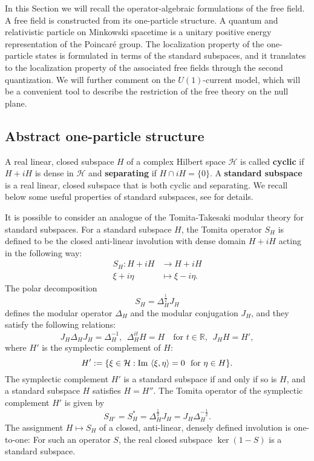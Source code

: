 \documentclass[12pt]{article}
\def\RR{{\mathbb R}}
\def\H{{\mathcal H}}
\def\im{\mathrm{Im}\,}
\theoremstyle{remark}
\begin{document}
 In this Section we will recall the operator-algebraic formulations of the free field.
 A free field is constructed from its one-particle structure. A quantum and relativistic particle on Minkowski spacetime is a unitary positive energy representation of the Poincar\'e group. The localization property of the one-particle states is formulated in terms of the standard subspaces,
 and it translates to the localization property of the associated free fields through the second quantization.
 We will further comment on the $U(1)$-current model, which will be a convenient tool to describe the restriction of the free theory  on the null plane.

\subsection{Abstract one-particle structure}\label{sec:ss}
A real linear, closed subspace $H$ of a complex Hilbert space $\H$ is called \textbf{cyclic} if $H+iH$ is dense in $\H$
and \textbf{separating} if $H\cap i H=\{0\}$. A \textbf{standard subspace} is a real linear, closed subspace that is both cyclic and separating.
We recall below some useful properties of standard subspaces, see \cite{Longo08} for details.


It is possible to consider an analogue of the Tomita-Takesaki modular theory for standard subspaces.
For a standard subspace $H$, the Tomita operator $S_H$ is defined to be the closed anti-linear involution with dense domain $H+iH$
acting in the following way:
\begin{align*}
S_H: H+iH &\rightarrow H+iH \\
\xi+i\eta &\mapsto \xi -i \eta.
\end{align*}
The polar decomposition
\[
S_H= \Delta_H^\frac{1}{2}J_H
\]
defines the modular operator $\Delta_H$ and the modular conjugation $J_H$, and they satisfy the following relations:
\[
J_H\Delta_H J_H= \Delta_H^{-1},\ \ \Delta_H^{it}H=H \quad\text{for } t\in\RR, \ \ J_H H=H',
\]
where $H'$ is the symplectic complement of $H$:
\[
H':=\{\xi \in \H: \im\braket{\xi,\eta}=0\ \text{ for } \eta\in H\}.
\]
The symplectic complement $H'$ is a standard subspace if and only if so is $H$,
and a standard subspace $H$ satisfies $H=H''$.
The Tomita operator of the symplectic complement $H'$ is given by
\[
S_{H'}=S_H^* = \Delta_H^\frac12 J_H = J_H \Delta_H^{-\frac12}.
\]
The assignment $H\mapsto S_H$ of a closed, anti-linear, densely defined involution
is one-to-one: For such an operator $S$, the real closed subspace
$\ker (1-S)$ is a standard subspace.
\end{document}
